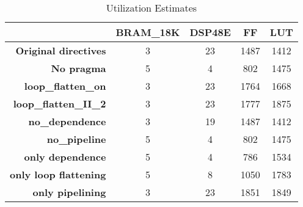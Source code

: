 


\begin{table}[H]
\begin{center}
\begin{tabular}{rcccc}
\toprule
 & \textbf{BRAM\_18K} & \textbf{DSP48E} & \textbf{FF} & \textbf{LUT}\\ \midrule
\textbf{Original directives} & 3 & 23 & 1487 & 1412 \\ 
\textbf{No pragma} & 5 & 4 & 802 & 1475 \\ 
\textbf{loop\_flatten\_on} & 3 & 23 & 1764 & 1668 \\ 
\textbf{loop\_flatten\_II\_2} & 3 & 23 & 1777 & 1875 \\ 
\textbf{no\_dependence} & 3 & 19 & 1487 & 1412 \\ 
\textbf{no\_pipeline} & 5 & 4 & 802 & 1475 \\ 
\textbf{only dependence} & 5 & 4 & 786 & 1534 \\ 
\textbf{only loop flattening} & 5 & 8 & 1050 & 1783 \\ 
\textbf{only pipelining} & 3 & 23 & 1851 & 1849 \\ \bottomrule
\end{tabular}
\end{center}
\caption{Utilization Estimates}
\label{tab:utilization_estimates}
\end{table}


